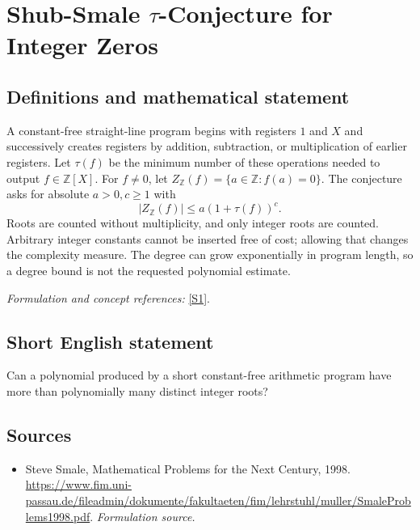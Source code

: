 \documentclass[11pt]{article}
\begin{document}
\section*{\texorpdfstring{Shub-Smale \ensuremath{\tau}-Conjecture for Integer Zeros}{Shub-Smale τ-Conjecture for Integer Zeros}}\label{224}
\subsection{Definitions and mathematical statement}
A constant-free straight-line program begins with registers $1$ and $X$ and successively creates registers by addition, subtraction, or multiplication of earlier registers. Let $\tau(f)$ be the minimum number of these operations needed to output $f\in{\mathbb{Z}}[X]$. For $f\ne0$, let $Z_{{\mathbb{Z}}}(f)=\{a\in{\mathbb{Z}}:f(a)=0\}$. The conjecture asks for absolute $a>0,c\ge1$ with
\[
 |Z_{{\mathbb{Z}}}(f)|\le a(1+\tau(f))^c.
\]
Roots are counted without multiplicity, and only integer roots are counted. Arbitrary integer constants cannot be inserted free of cost; allowing that changes the complexity measure. The degree can grow exponentially in program length, so a degree bound is not the requested polynomial estimate.
\par\smallskip\textit{Formulation and concept references:} \href{https://www.fim.uni-passau.de/fileadmin/dokumente/fakultaeten/fim/lehrstuhl/muller/SmaleProblems1998.pdf}{[S1]}.

\subsection{Short English statement}
Can a polynomial produced by a short constant-free arithmetic program have more than polynomially many distinct integer roots?
\subsection{Sources}
\begin{itemize}
\item[S1]Steve Smale, Mathematical Problems for the Next Century, 1998.
\url{https://www.fim.uni-passau.de/fileadmin/dokumente/fakultaeten/fim/lehrstuhl/muller/SmaleProblems1998.pdf}.
\textit{Formulation source.}
\end{itemize}
\end{document}
